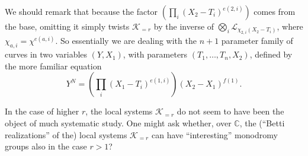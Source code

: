 We should remark that because the factor \(\left(\prod_i(X_2-T_i)^{e(2,i)}\right)\) comes from the base, omitting it simply twists \(\mathcal{K}_{=r}\) by the inverse of \(\bigotimes_i\mathcal{L}_{\chi_{2,i}(X_2-T_i)}\), where \(\chi_{a,i}=\chi^{e(a,i)}\). So essentially we are dealing with the \(n+1\) parameter family of curves in two variables \((Y,X_1)\), with parameters \((T_1,\ldots,T_n,X_2)\), defined by the more familiar equation
\[
Y^N=\left(\prod_i(X_1-T_i)^{e(1,i)}\right)(X_2-X_1)^{f(1)}.
\]

In the case of higher \(r\), the local systems \(\mathcal{K}_{=r}\) do not seem to have been the object of much systematic study. One might ask whether, over \(\mathbb{C}\), the (``Betti realizations'' of the) local systems \(\mathcal{K}_{=r}\) can have ``interesting'' monodromy groups also in the case \(r>1\)?
